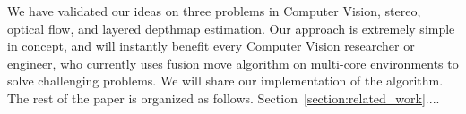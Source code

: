 We have validated our ideas on three problems in Computer Vision,
stereo, optical flow, and layered depthmap estimation.   Our approach is extremely simple in concept, and
will instantly benefit every Computer Vision researcher or engineer, who
currently uses fusion move algorithm on multi-core environments to solve
challenging problems. We will share our implementation of the
algorithm. The rest of the paper is organized as
follows. Section~\ref{section:related_work}....


%
%


%



%



%


